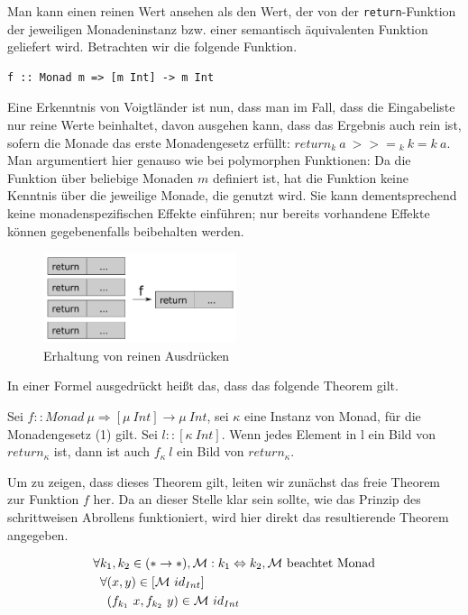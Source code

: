 Man kann einen reinen Wert ansehen als den Wert, der von der \texttt{return}-Funktion der jeweiligen Monadeninstanz
bzw. einer semantisch äquivalenten Funktion geliefert wird. Betrachten wir die folgende Funktion.

\begin{verbatim}
f :: Monad m => [m Int] -> m Int
\end{verbatim}

Eine Erkenntnis von Voigtländer ist nun, dass man im Fall, dass die Eingabeliste nur reine Werte beinhaltet, davon ausgehen
kann, dass das Ergebnis auch rein ist, sofern die Monade das erste Monadengesetz erfüllt: $return_k\ a\ {>>=}_k\ k = k\ a$. Man argumentiert hier genauso wie bei polymorphen Funktionen: Da die Funktion über
beliebige Monaden $m$ definiert ist, hat die Funktion keine Kenntnis über die jeweilige Monade, die genutzt wird.
Sie kann dementsprechend keine monadenspezifischen Effekte einführen; nur bereits vorhandene
Effekte können gegebenenfalls beibehalten werden.

\begin{figure}[ht]
\centering
\includegraphics[height=100px]{purity-preservation}
\caption{Erhaltung von reinen Ausdrücken}
\label{fig:purity-preservation}
\end{figure}

In einer Formel ausgedrückt heißt das, dass das folgende Theorem gilt.

\begin{mytheorem}
Sei $f :: Monad\ \mu \Rightarrow [\mu\ Int] \rightarrow \mu\ Int$, sei $\kappa$ eine Instanz von Monad, für die Monadengesetz (1) gilt.
Sei $l :: [\kappa\ Int]$. Wenn jedes Element in l ein Bild von $return_{\kappa}$ ist, dann ist auch $f_{\kappa}\ l$ ein Bild von $return_{\kappa}$.
\end{mytheorem}

Um zu zeigen, dass dieses Theorem gilt, leiten wir zunächst das freie Theorem zur Funktion $f$ her. Da an dieser Stelle klar sein
sollte, wie das Prinzip des schrittweisen Abrollens funktioniert, wird hier direkt das resultierende Theorem angegeben.

\begin{align*}
& \forall k_1, k_2 \in (* \rightarrow *), \mathcal{M} : k_1 \Leftrightarrow k_2, \mathcal{M}~\text{beachtet Monad} \\
& \hphantom{\forall} \forall (x, y) \in [\mathcal{M}\ id_{Int}] \\
& \hphantom{\forall \forall} (f_{k_1}\ x, f_{k_2}\ y) \in \mathcal{M}\ id_{Int}
\end{align*}

